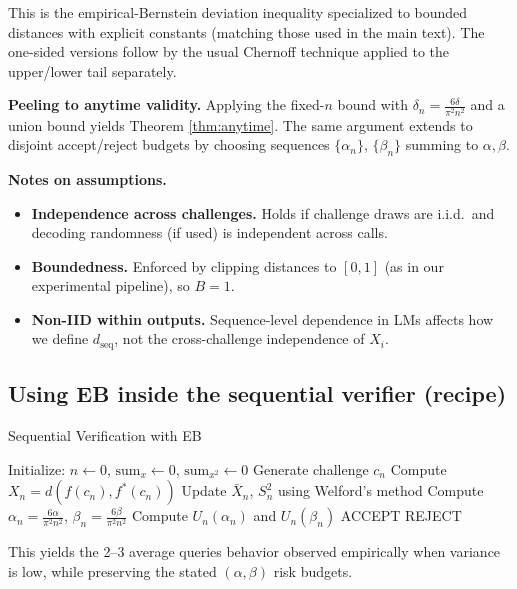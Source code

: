 \documentclass[11pt]{article}
\begin{document}
This is the empirical-Bernstein deviation inequality specialized to bounded distances with explicit constants (matching those used in the main text). The one-sided versions follow by the usual Chernoff technique applied to the upper/lower tail separately.

\textbf{Peeling to anytime validity.} Applying the fixed-$n$ bound with $\delta_n=\frac{6\delta}{\pi^2 n^2}$ and a union bound yields Theorem \ref{thm:anytime}. The same argument extends to disjoint accept/reject budgets by choosing sequences $\{\alpha_n\}$, $\{\beta_n\}$ summing to $\alpha,\beta$.

\textbf{Notes on assumptions.}
\begin{itemize}
\item \textbf{Independence across challenges.} Holds if challenge draws are i.i.d.\ and decoding randomness (if used) is independent across calls.
\item \textbf{Boundedness.} Enforced by clipping distances to $[0,1]$ (as in our experimental pipeline), so $B=1$.
\item \textbf{Non-IID within outputs.} Sequence-level dependence in LMs affects how we define $d_{\text{seq}}$, not the cross-challenge independence of $X_i$.
\end{itemize}

\subsection{Using EB inside the sequential verifier (recipe)}

\begin{algorithm}
\caption{Sequential Verification with EB}
\begin{algorithmic}[1]
\STATE Initialize: $n \gets 0$, $\text{sum}_x \gets 0$, $\text{sum}_{x^2} \gets 0$
    \STATE Generate challenge $c_n$
    \STATE Compute $X_n = d(f(c_n), f^*(c_n))$
    \STATE Update $\bar{X}_n$, $S_n^2$ using Welford's method
    \STATE Compute $\alpha_n = \frac{6\alpha}{\pi^2 n^2}$, $\beta_n = \frac{6\beta}{\pi^2 n^2}$
    \STATE Compute $U_n(\alpha_n)$ and $U_n(\beta_n)$
        \RETURN ACCEPT
        \RETURN REJECT
    \ENDIF
\ENDFOR
\end{algorithmic}
\end{algorithm}

This yields the 2–3 average queries behavior observed empirically when variance is low, while preserving the stated $(\alpha,\beta)$ risk budgets.
\end{document}
